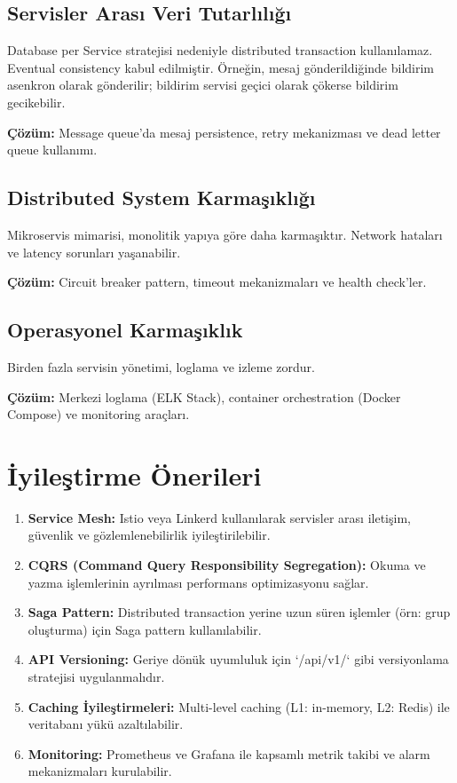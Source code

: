 \subsection{Servisler Arası Veri Tutarlılığı}
Database per Service stratejisi nedeniyle distributed transaction kullanılamaz. Eventual consistency kabul edilmiştir. Örneğin, mesaj gönderildiğinde bildirim asenkron olarak gönderilir; bildirim servisi geçici olarak çökerse bildirim gecikebilir.

\textbf{Çözüm:} Message queue'da mesaj persistence, retry mekanizması ve dead letter queue kullanımı.

\subsection{Distributed System Karmaşıklığı}
Mikroservis mimarisi, monolitik yapıya göre daha karmaşıktır. Network hataları ve latency sorunları yaşanabilir.

\textbf{Çözüm:} Circuit breaker pattern, timeout mekanizmaları ve health check'ler.

\subsection{Operasyonel Karmaşıklık}
Birden fazla servisin yönetimi, loglama ve izleme zordur.

\textbf{Çözüm:} Merkezi loglama (ELK Stack), container orchestration (Docker Compose) ve monitoring araçları.

\section{İyileştirme Önerileri}

\begin{enumerate}
    \item \textbf{Service Mesh:} Istio veya Linkerd kullanılarak servisler arası iletişim, güvenlik ve gözlemlenebilirlik iyileştirilebilir.
    \item \textbf{CQRS (Command Query Responsibility Segregation):} Okuma ve yazma işlemlerinin ayrılması performans optimizasyonu sağlar.
    \item \textbf{Saga Pattern:} Distributed transaction yerine uzun süren işlemler (örn: grup oluşturma) için Saga pattern kullanılabilir.
    \item \textbf{API Versioning:} Geriye dönük uyumluluk için `/api/v1/` gibi versiyonlama stratejisi uygulanmalıdır.
    \item \textbf{Caching İyileştirmeleri:} Multi-level caching (L1: in-memory, L2: Redis) ile veritabanı yükü azaltılabilir.
    \item \textbf{Monitoring:} Prometheus ve Grafana ile kapsamlı metrik takibi ve alarm mekanizmaları kurulabilir.
\end{enumerate}

